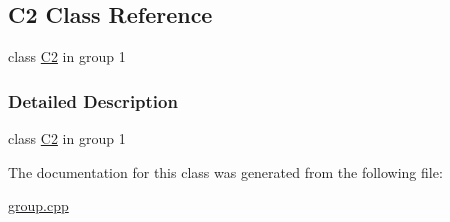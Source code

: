 \hypertarget{class_c2}{}\subsection{C2 Class Reference}
\label{class_c2}


class \mbox{\hyperlink{class_c2}{C2}} in group 1  




\subsubsection{Detailed Description}
class \mbox{\hyperlink{class_c2}{C2}} in group 1 

The documentation for this class was generated from the following file\+:\begin{DoxyCompactItemize}
\item 
\mbox{\hyperlink{group_8cpp}{group.\+cpp}}\end{DoxyCompactItemize}

